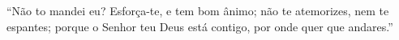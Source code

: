 ``Não to mandei eu? Esforça-te, e tem bom ânimo; não te atemorizes, nem te espantes; porque o Senhor teu Deus está contigo, por onde quer que andares.''

